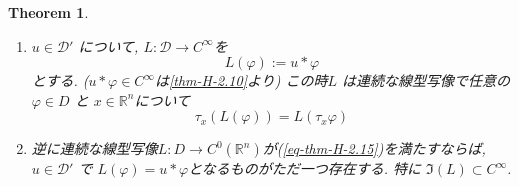 \documentclass[dvipdfmx,a4paper,11pt]{article} %
\newtheorem{thm}{Theorem}[section]
\theoremstyle{definition}
\theoremstyle{remark}
\numberwithin{equation}{section}
\newcommand{\R}{\mathbb{R}}
\begin{document}
\begin{tcolorbox}[mybox]
\begin{thm}\cite[Theorem 6.33]{Rud}
\label{thm-H-2.15}
\begin{enumerate}[label=$(\alph*)$]
\item \(u \in \mathcal{D}'\) について, \(L : \mathcal{D} \to C^\infty\)を
\[
L(\varphi) := u \ast \varphi 
\]
とする. ($u \ast \varphi  \in C^\infty$は\ref{thm-H-2.10}より)
この時\(L\) は連続な線型写像で任意の\(\varphi \in D\) と \(x \in \R^n\)について
\begin{equation}
\label{eq-thm-H-2.15}
\tau_x(L(\varphi)) = L(\tau_x \varphi) 
\end{equation}
\item 逆に連続な線型写像\(L : D \to C^0(\R^n)\)が(\ref{eq-thm-H-2.15})を満たすならば, 
\(u \in \mathcal{D}'\) で \(L(\varphi) = u \ast \varphi\)となるものがただ一つ存在する. 
特に \(\Im(L) \subset C^\infty\).
\end{enumerate}
\end{thm}
\end{tcolorbox}
\end{document}
